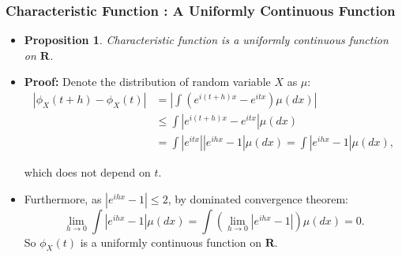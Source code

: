 \documentclass[handout]{beamer}
\newtheorem{Proposition}[theorem]{Proposition}%
\begin{document}
\frame
{
  \frametitle{Characteristic Function : A Uniformly Continuous Function} 

   \begin{itemize}
          
\item<1->[] \begin{Proposition} Characteristic function is a uniformly continuous function on $\mathbf{R}$. \end{Proposition}
                                          
\item<2-> \textbf{Proof:} Denote the distribution of random variable $X$ as $\mu$:
\begin{align*}
|\phi_X(t+h)-\phi_X(t)| & =|\int (e^{i(t+h)x}-e^{itx})\mu(dx)| \\ 
& \leq \int |e^{i(t+h)x}-e^{itx} | \mu(dx) \\
&=  \int |e^{itx}| |e^{ihx}-1 | \mu(dx) =\int  |e^{ihx}-1 | \mu(dx),
\end{align*}                    

\noindent which does not depend on $t$. 

\item<3-> [-] Furthermore, as $| e^{ihx}-1 | \leq 2$, by  dominated convergence theorem: 
$$\lim_{h\rightarrow 0} \int | e^{ihx}-1 | \mu(dx) =\int ( \lim_{h\rightarrow 0} |e^{ihx}-1 |) \mu(dx)=0.$$
                                        \noindent So $\phi_X(t)$ is a  uniformly continuous function on $\mathbf{R}$.
                                               \end{itemize}
}
\end{document}
